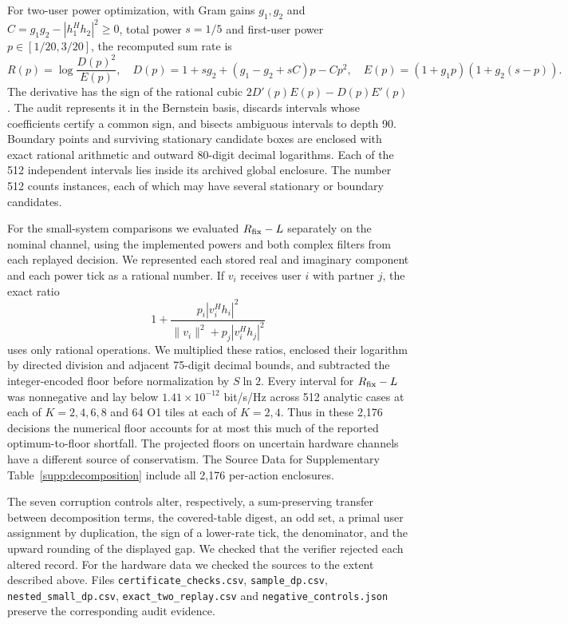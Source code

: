 \documentclass[10pt,letterpaper]{article}
\begin{document}
For two-user power optimization, with Gram gains $g_1,g_2$ and
$C=g_1g_2-|h_1^Hh_2|^2\geq0$, total power $s=1/5$ and first-user power
$p\in[1/20,3/20]$, the recomputed sum rate is
\begin{equation}
 R(p)=\log\frac{D(p)^2}{E(p)},\quad
 D(p)=1+sg_2+(g_1-g_2+sC)p-Cp^2,\quad
 E(p)=(1+g_1p)(1+g_2(s-p)).
\end{equation}
The derivative has the sign of the rational cubic
$2D'(p)E(p)-D(p)E'(p)$. The audit represents it in the Bernstein basis,
discards intervals whose coefficients certify a common sign, and bisects
ambiguous intervals to depth 90. Boundary points and surviving stationary
candidate boxes are enclosed with exact rational arithmetic and outward
80-digit decimal logarithms. Each of the 512 independent intervals lies
inside its archived global enclosure. The number 512 counts instances,
each of which may have several stationary or boundary candidates.

For the small-system comparisons we evaluated \(R_{\rm fix}-L\) separately on the nominal channel, using the implemented powers and both complex filters from each replayed decision. We represented each stored real and imaginary component and each power tick as a rational number. If \(v_i\) receives user \(i\) with partner \(j\), the exact ratio
\[
1+\frac{p_i|v_i^Hh_i|^2}{\|v_i\|^2+p_j|v_i^Hh_j|^2}
\]
uses only rational operations. We multiplied these ratios, enclosed their logarithm by directed division and adjacent 75-digit decimal bounds, and subtracted the integer-encoded floor before normalization by \(S\ln2\). Every interval for \(R_{\rm fix}-L\) was nonnegative and lay below \(1.41\times10^{-12}\) bit/s/Hz across 512 analytic cases at each of \(K=2,4,6,8\) and 64 O1 tiles at each of \(K=2,4\). Thus in these 2,176 decisions the numerical floor accounts for at most this much of the reported optimum-to-floor shortfall. The projected floors on uncertain hardware channels have a different source of conservatism. The Source Data for Supplementary Table~\ref{supp:decomposition} include all 2,176 per-action enclosures.

The seven corruption controls alter, respectively, a sum-preserving transfer
between decomposition terms, the covered-table digest, an odd set, a primal user
assignment by duplication, the sign of a lower-rate tick, the denominator,
and the upward rounding of the displayed gap. We checked that the verifier rejected each altered record. For the hardware data we checked the sources to the extent described above. Files \texttt{certificate\_checks.csv}, \texttt{sample\_dp.csv},
\texttt{nested\_small\_dp.csv}, \texttt{exact\_two\_replay.csv} and
\texttt{negative\_controls.json} preserve the corresponding audit evidence.
\end{document}
